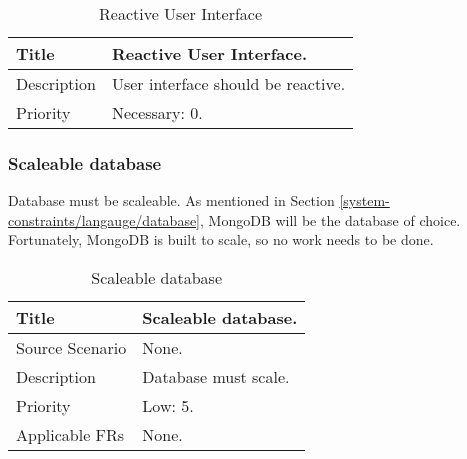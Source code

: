   \begin{table}[h!]
    \caption{Reactive User Interface}
    \label{system-requirements/non-functional/reactive-UI-table}
    \begin{tabularx}{\textwidth}{|l|X|}
      \hline
      Title           & Reactive User Interface. \\ \hline
      Description     & User interface should be reactive.\\ \hline
      Priority        & Necessary: 0. \\ \hline
    \end{tabularx}
  \end{table}

\subsubsection{Scaleable database}
  Database must be scaleable. As mentioned in Section
  \ref{system-constraints/langauge/database}, MongoDB will be the database of
  choice. Fortunately, MongoDB is built to scale, so no work needs to be done.

  \begin{table}[h!]
    \caption{Scaleable database}
    \label{system-requirements/non-functional/scaleable-database-table}
    \begin{tabularx}{\textwidth}{|l|X|}
      \hline
      Title           & Scaleable database. \\ \hline
      Source Scenario & None. \\ \hline
      Description     & Database must scale.\\ \hline
      Priority        & Low: 5. \\ \hline
      Applicable FRs  & None. \\ \hline
    \end{tabularx}
  \end{table}
